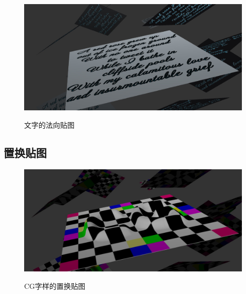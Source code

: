 \documentclass{article}
\begin{document}
	\begin{figure}[htb]
		\caption{\label{table.label} 文字的法向贴图} \centering
		\begin{center}
			\includegraphics[width=5in]{normal3.jpg}
			\label{figure.label}
		\end{center}
	\end{figure}
	\clearpage
	\subsection{置换贴图}
	
	\begin{figure}[htb]
		\caption{\label{table.label} CG字样的置换贴图} \centering
		\begin{center}
			\includegraphics[width=5in]{displace.jpg}
			\label{figure.label}
		\end{center}
	\end{figure}
	
	
	
\end{document}
